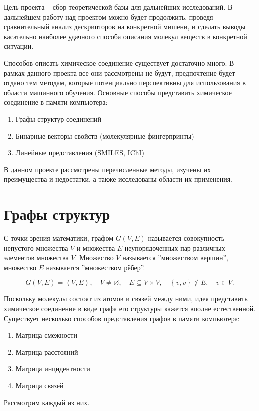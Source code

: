 \documentclass[a4paper,14pt]{extreport}
\begin{document}
Цель проекта -- сбор теоретической базы для дальнейших исследований. В дальнейшем работу над проектом можно будет продолжить, проведя сравнительный анализ дескрипторов на конкретной мишени, и сделать выводы касательно наиболее удачного способа описания молекул веществ в конкретной ситуации.

Способов описать химическое соединение существует достаточно много. В рамках данного проекта все они рассмотрены не будут, предпочтение будет отдано тем методам, которые потенциально перспективны для использования в области машинного обучения.
Основные способы представить химическое соединение в памяти компьютера:
\begin{enumerate}
  \item Графы структур соединений
  \item Бинарные векторы свойств (молекулярные фингерпринты)
  \item Линейные представления (SMILES, IChI)
\end{enumerate}

В данном проекте рассмотрены перечисленные методы, изучены их преимущества и недостатки, а также исследованы области их применения.

  
  
  
  

  
  
  \chapter{Графы структур}
  \label{c:graphs}
  
  С точки зрения математики, графом $G(V,E)$ называется совокупность непустого множества $V$ и множества $E$ неупорядоченных пар различных элементов множества $V$. Множество $V$ называется ''множеством вершин'', множество $E$ называется ''множеством рёбер''.

$$G(V,E) = \left \langle V,E \right \rangle, \quad  V  \ne \varnothing , \quad E \subseteq V \times V , \quad  \left \{ v,v \right \} \notin E, \quad v \in V .$$
  
  Поскольку молекулы состоят из атомов и связей между ними, идея представить химическое соединение в виде графа его структуры кажется вполне естественной. Существует несколько способов представления графов в памяти компьютера:
  \begin{enumerate}
	\item Матрица смежности
	\item Матрица расстояний
	\item Матрица инцидентности
	\item Матрица связей
\end{enumerate}
Рассмотрим каждый из них.
  
\end{document}
